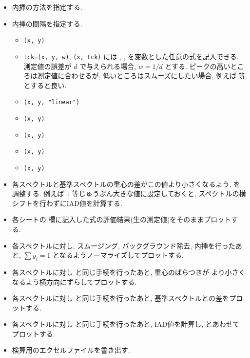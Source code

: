 \begin{itemize}
\item {} 内挿の方法を指定する.
\item {} 内挿の間隔を指定する.
  \begin{itemize}
  \item {} \texttt{(x, y)}
  \item {} \texttt{tck=(x, y, w)},
    \texttt{(x, tck)}
     には , ,  を変数とした任意の式を記入できる.
    測定値の誤差が $d$ で与えられる場合, $w=1/d$ とする.
    ピークの高いところは測定値に合わせるが, 低いところはスムーズにしたい場合,
    例えば  等とすると良い.
  \item {} \texttt{(x, y, "linear")}
  \item {} \texttt{(x, y)}
  \item {} \texttt{(x, y)}
  \item {} \texttt{(x, y)}
  \item {} \texttt{(x, y)}
  \end{itemize}
\item {} 各スペクトルと基準スペクトルの重心の差がこの値より小さくなるよう,
   を調整する. 例えば $1$ 等じゅうぶん大きな値に設定しておくと,
  スペクトルの横シフトを行わずにIAD値を計算する.
\end{itemize}

\vspace{1em}

\begin{itemize}
\item {} 各シートの  欄に記入した式の評価結果(生の測定値)をそのままプロットする.
\item {} 各スペクトルに対し, スムージング, バックグラウンド除去, 内挿を行ったあと,
  $\sum y_i = 1$ となるようノーマライズしてプロットする.
\item {} 各スペクトルに対し  と同じ手続を行ったあと,
  重心のばらつきが  より小さくなるよう横方向にずらしてプロットする.
\item {} 各スペクトルに対し  と同じ手続を行ったあと,
  基準スペクトルとの差をプロットする.
\item {} 各スペクトルに対し  と同じ手続を行ったあと,
  IAD値を計算し,  とあわせてプロットする.
\item {} 検算用のエクセルファイルを書き出す.
\end{itemize}
